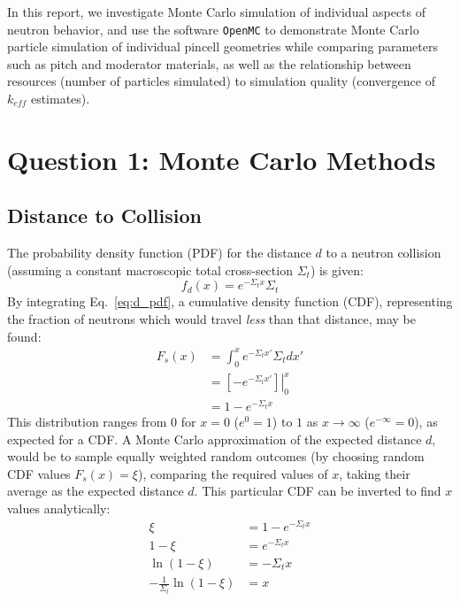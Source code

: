 \documentclass[11pt]{article} %
\begin{document}
In this report, we investigate Monte Carlo simulation of individual aspects of neutron behavior, and use the software \texttt{OpenMC} to demonstrate Monte Carlo particle simulation of individual pincell geometries while comparing parameters such as pitch and moderator materials, as well as the relationship between resources (number of particles simulated) to simulation quality (convergence of $k_{eff}$ estimates).


\clearpage %

\section{Question 1: Monte Carlo Methods}\label{sec:q1}
\FloatBarrier
\subsection{Distance to Collision}
The probability density function (PDF) for the distance $d$ to a neutron collision (assuming a constant macroscopic total cross-section $\Sigma_t$) is given:
\begin{equation}
    f_d(x)=e^{-\Sigma_t x}\Sigma_t
    \label{eq:d_pdf}
\end{equation}
By integrating Eq.~\ref{eq:d_pdf}, a cumulative density function (CDF), representing the fraction of neutrons which would travel \emph{less} than that distance, may be found:
\begin{equation}
    \begin{aligned}
        F_s(x) &= \int_{0}^{x}e^{-\Sigma_t x'}\Sigma_t dx'\\
        &= \left.\left[-e^{-\Sigma_t x'}\right]\right|_0^x \\
        &= 1-e^{-\Sigma_t x}
    \end{aligned}
\end{equation}
This distribution ranges from 0 for $x=0$ ($e^0=1$) to $1$ as $x\rightarrow\infty$ ($e^{-\infty}=0$), as expected for a CDF.
A Monte Carlo approximation of the expected distance $d$, would be to sample equally weighted random outcomes (by choosing random CDF values $F_s(x)=\xi$), comparing the required values of $x$, taking their average as the expected distance $d$.
This particular CDF can be inverted to find $x$ values analytically:
\begin{equation}
    \begin{aligned}
        \xi &= 1-e^{-\Sigma_t x}\\
        1-\xi &= e^{-\Sigma_t x}\\
        \ln(1-\xi) &= -\Sigma_t x\\
        -\frac{1}{\Sigma_t}\ln(1-\xi) &= x\\
    \end{aligned}
    \label{eq:cdf-invert}
\end{equation}
\end{document}
